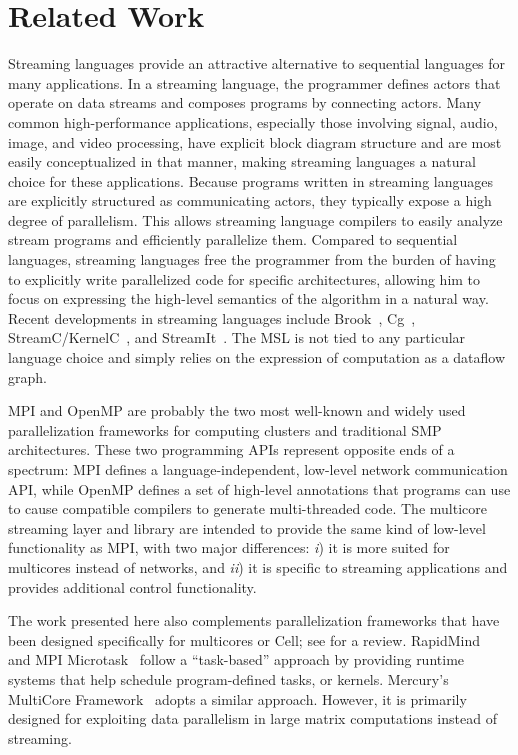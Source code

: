 \section{Related Work}\label{ch:bg}

Streaming languages provide an attractive alternative to sequential
languages for many applications. In a streaming language, the
programmer defines actors that operate on data streams and composes
programs by connecting actors. Many common high-performance
applications, especially those involving signal, audio, image, and
video processing, have explicit block diagram structure and are most
easily conceptualized in that manner, making streaming languages a
natural choice for these applications.
Because programs written in streaming languages are explicitly
structured as communicating actors, they typically expose a high
degree of parallelism. This allows streaming language compilers to
easily analyze stream programs and efficiently parallelize
them. Compared to sequential languages, streaming languages free the
programmer from the burden of having to explicitly write parallelized
code for specific architectures, allowing him to focus on expressing
the high-level semantics of the algorithm in a natural way.
Recent developments in streaming languages include Brook~\cite{brook},
Cg~\cite{cg}, StreamC/KernelC~\cite{streamc}, and StreamIt~\cite{streamitweb}.
The MSL is not tied to any particular language choice and simply
relies on the expression of computation as a dataflow graph.
 
MPI and OpenMP are probably the two most well-known and widely used
parallelization frameworks for computing clusters and traditional SMP
architectures. These two programming APIs represent opposite ends of a
spectrum: MPI defines a language-independent, low-level network
communication API, while OpenMP defines a set of 
high-level annotations that programs can use to cause compatible
compilers to generate multi-threaded code.  The multicore streaming
layer and library are intended to provide the same kind of low-level
functionality as MPI, with two major differences: \emph{i}) it is more
suited for multicores instead of networks, and \emph{ii}) it is
specific to streaming applications and provides additional control
functionality.

The work presented here also complements parallelization frameworks
that have been designed specifically for multicores or Cell; see
\cite{cell:pf} for a review. RapidMind~\cite{rapidmind} and MPI
Microtask~\cite{mpimicrotask} follow a
``task-based'' approach by providing runtime systems that help
schedule program-defined tasks, or kernels. Mercury's MultiCore
Framework~\cite{mcf} adopts a similar approach. However, it is
primarily designed for exploiting data parallelism in large matrix computations instead of streaming. 


